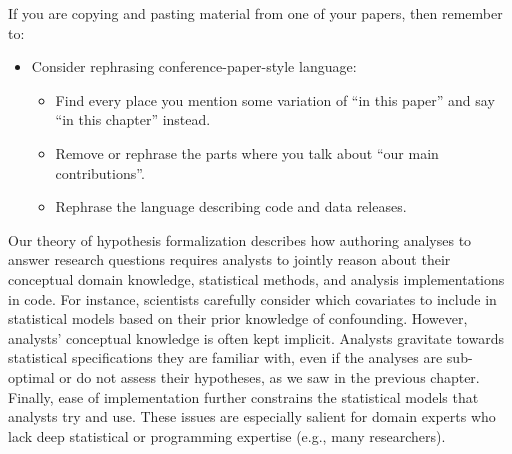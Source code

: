 \def\adult{\texttt{adult}\xspace}
\def\poundslost{\texttt{pounds\_lost}\xspace}
\def\motivation{\texttt{motivation}\xspace}
\def\regimen{\texttt{regimen\_condition}\xspace}
\def\regimencondition{\texttt{regimen\_condition}\xspace}
\def\group{\texttt{group}\xspace}
\def\age{\texttt{age}\xspace}

If you are copying and pasting material from one of your papers, then remember to:
\begin{itemize}
    \item Consider rephrasing conference-paper-style language:
    \begin{itemize}
        \item Find every place you mention some variation of ``in this paper'' and say ``in this chapter'' instead.
        \item Remove or rephrase the parts where you talk about ``our main contributions''.
        \item Rephrase the language describing code and data releases.
    \end{itemize}
\end{itemize}

Our theory of hypothesis formalization describes how authoring analyses to
answer research questions requires analysts to jointly reason about their
conceptual domain knowledge, statistical methods, and analysis implementations
in code. For instance, scientists carefully consider which covariates to include
in statistical models based on their prior knowledge of confounding. However,
analysts' conceptual knowledge is often kept implicit. Analysts gravitate
towards statistical specifications they are familiar with, even if the analyses
are sub-optimal or do not assess their hypotheses, as we saw in the previous
chapter. Finally, ease of implementation further constrains the statistical
models that analysts try and use. These issues are especially salient for domain
experts who lack deep statistical or programming expertise (e.g., many
researchers).

